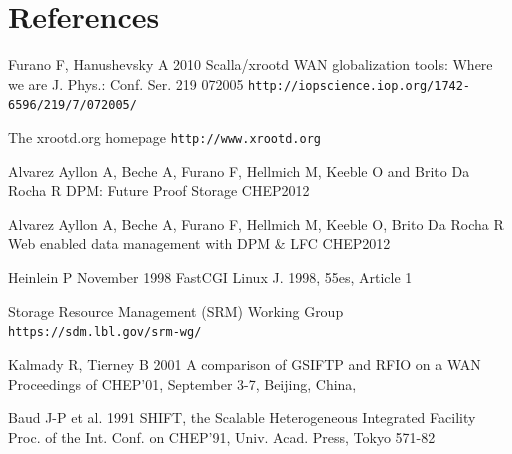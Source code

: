 \documentclass[a4paper]{jpconf}
\begin{document}
\section*{References}
\begin{thebibliography}{9}

 Furano F, Hanushevsky A
2010 Scalla/xrootd WAN globalization tools: Where we are
J. Phys.: Conf. Ser. 219 072005
\verb"http://iopscience.iop.org/1742-6596/219/7/072005/"

 The xrootd.org homepage
\verb"http://www.xrootd.org"

 Alvarez Ayllon A, Beche A, Furano F, Hellmich M, Keeble O and Brito Da Rocha R
DPM: Future Proof Storage
CHEP2012

 Alvarez Ayllon A, Beche A, Furano F, Hellmich M, Keeble O, Brito Da Rocha R
Web enabled data management with DPM \& LFC
CHEP2012

 Heinlein P
November 1998 FastCGI
Linux J. 1998, 55es, Article 1

 Storage Resource Management (SRM) Working Group
\verb"https://sdm.lbl.gov/srm-wg/"

 Kalmady R, Tierney B
2001 A comparison of GSIFTP and RFIO on a WAN
Proceedings of CHEP'01, September 3-7, Beijing, China,

 Baud J-P et al.
1991 SHIFT, the Scalable Heterogeneous Integrated Facility
Proc. of the Int. Conf. on CHEP'91, Univ. Acad. Press, Tokyo 571-82

\end{thebibliography}
\end{document}
